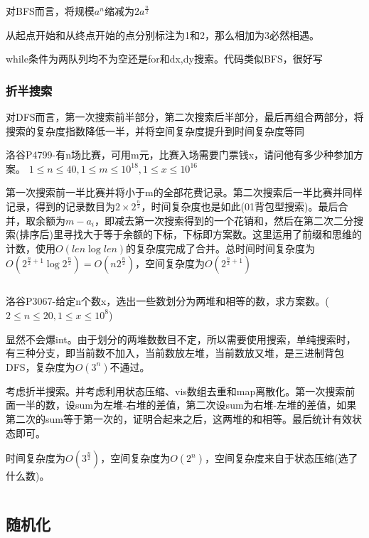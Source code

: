 \documentclass[twocolumn,10pt]{ctexart}
\newcommand{\Omicron}{O}
\begin{document}
对BFS而言，将规模$a^n$缩减为$2a^{\frac n2}$

从起点开始和从终点开始的点分别标注为1和2，那么相加为3必然相遇。

while条件为两队列均不为空还是for和dx,dy搜索。代码类似BFS，很好写

\subsubsection{折半搜索}

对DFS而言，第一次搜索前半部分，第二次搜索后半部分，最后再组合两部分，将搜索的复杂度指数降低一半，并将空间复杂度提升到时间复杂度等同

\begin{notebox}
洛谷P4799-有n场比赛，可用m元，比赛入场需要门票钱x，请问他有多少种参加方案。 $1\le n\le40,\allowbreak{}1\le m\le10^{18},\allowbreak{}1\le x\le10^{16}$
\end{notebox}

第一次搜索前一半比赛并将小于m的全部花费记录。第二次搜索后一半比赛并同样记录，得到的记录数目为$2\times2^{\frac n2}$，时间复杂度也是如此(01背包型搜索)。最后合并，取余额为$m-a_i$，即减去第一次搜索得到的一个花销和，然后在第二次二分搜索(排序后)里寻找大于等于余额的下标，下标即方案数。这里运用了前缀和思维的计数，使用$O(len\log len)$的复杂度完成了合并。总时间时间复杂度为$\Omicron(2^{\frac n2+1}\log2^{\frac n2})=\Omicron(n2^{\frac n2})$，空间复杂度为$\Omicron(2^{\frac n2+1})$

\inputminted{cpp}{code/p4799_meet_in_the_middle.cpp}

\begin{notebox}
洛谷P3067-给定n个数x，选出一些数划分为两堆和相等的数，求方案数。($2\le n\le20,1\le x\le10^8$)
\end{notebox}

显然不会爆int。由于划分的两堆数数目不定，所以需要使用搜索，单纯搜索时，有三种分支，即当前数不加入，当前数放左堆，当前数放又堆，是三进制背包DFS，复杂度为$\Omicron(3^n)$不通过。

考虑折半搜索。并考虑利用状态压缩、vis数组去重和map离散化。第一次搜索前面一半的数，设sum为左堆-右堆的差值，第二次设sum为右堆-左堆的差值，如果第二次的sum等于第一次的，证明合起来之后，这两堆的和相等。最后统计有效状态即可。

时间复杂度为$\Omicron(3^{\frac n2})$，空间复杂度为$\Omicron(2^n)$，空间复杂度来自于状态压缩(选了什么数)。

\inputminted{cpp}{code/p3067_meet_in_the_middle.cpp}

\subsection{随机化}
\end{document}
